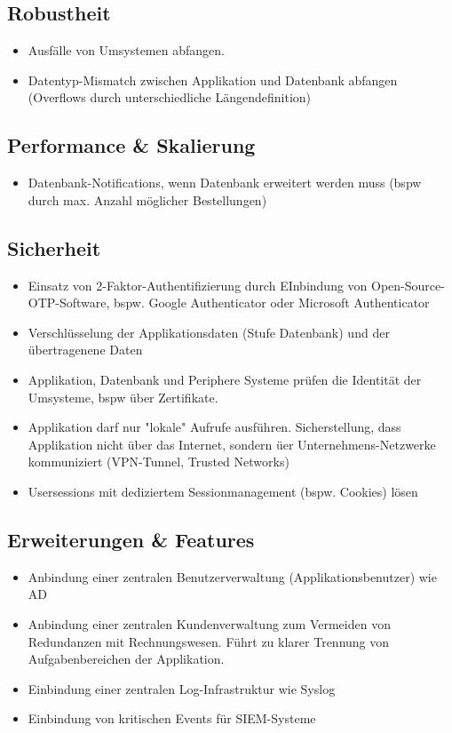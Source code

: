\subsection{Robustheit}
\begin{itemize}
	\item Ausfälle von Umsystemen abfangen.
	\item Datentyp-Mismatch zwischen Applikation und Datenbank abfangen (Overflows durch unterschiedliche Längendefinition)
\end{itemize}

\subsection{Performance \& Skalierung}
\begin{itemize}
	\item Datenbank-Notifications, wenn Datenbank erweitert werden muss (bspw durch max. Anzahl möglicher Bestellungen)
\end{itemize}

\subsection{Sicherheit}
\begin{itemize}
	\item Einsatz von 2-Faktor-Authentifizierung durch EInbindung von Open-Source-OTP-Software, bspw. Google Authenticator oder Microsoft Authenticator
	\item Verschlüsselung der Applikationsdaten (Stufe Datenbank) und der übertragenene Daten
	\item Applikation, Datenbank und Periphere Systeme prüfen die Identität der Umsysteme, bspw über Zertifikate.
	\item Applikation darf nur "lokale" Aufrufe ausführen. Sicherstellung, dass Applikation nicht über das Internet, sondern üer Unternehmens-Netzwerke kommuniziert (VPN-Tunnel, Trusted Networks)
	\item Usersessions mit dediziertem Sessionmanagement (bspw. Cookies) lösen
\end{itemize}

\subsection{Erweiterungen \& Features}
\begin{itemize}
	\item Anbindung einer zentralen Benutzerverwaltung (Applikationsbenutzer) wie AD
	\item Anbindung einer zentralen Kundenverwaltung zum Vermeiden von Redundanzen mit Rechnungswesen. Führt zu klarer Trennung von Aufgabenbereichen der Applikation.
	\item Einbindung einer zentralen Log-Infrastruktur wie Syslog
	\item Einbindung von kritischen Events für SIEM-Systeme
\end{itemize}